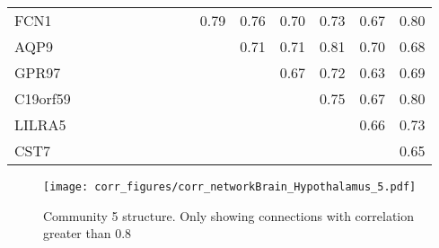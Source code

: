 \begin{longtable}{lrrrrrrrrrrrrrr}
FCN1     &              &               &              &              &             &             &            &            &       0.79 &        0.76 &           0.70 &         0.73 &       0.67 &       0.80 \\
AQP9     &              &               &              &              &             &             &            &            &            &        0.71 &           0.71 &         0.81 &       0.70 &       0.68 \\
GPR97    &              &               &              &              &             &             &            &            &            &             &           0.67 &         0.72 &       0.63 &       0.69 \\
C19orf59 &              &               &              &              &             &             &            &            &            &             &                &         0.75 &       0.67 &       0.80 \\
LILRA5   &              &               &              &              &             &             &            &            &            &             &                &              &       0.66 &       0.73 \\
CST7     &              &               &              &              &             &             &            &            &            &             &                &              &            &       0.65 \\
\end{longtable}


\begin{figure}[h!]
\centering
\texttt{[image: corr\_figures/corr\_networkBrain\_Hypothalamus\_5.pdf]}
\caption{Community 5 structure. Only showing connections with correlation greater than 0.8}
\end{figure}




